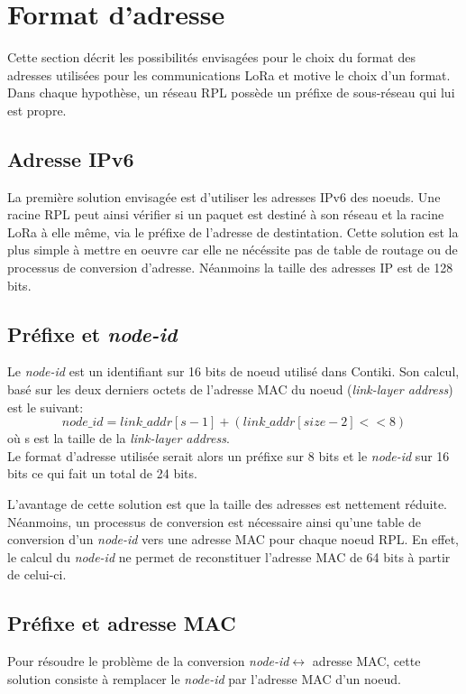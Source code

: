\section{Format d'adresse}\label{sec:archi-adresses}
\renewcommand{\rightmark}{Format d'adresse}

Cette section décrit les possibilités envisagées pour le choix du format des adresses utilisées pour les communications LoRa et motive le choix d'un format. Dans chaque hypothèse, un réseau RPL possède un préfixe de sous-réseau qui lui est propre.

\subsection*{Adresse IPv6}
    La première solution envisagée est d'utiliser les adresses IPv6 des noeuds.
    Une racine RPL peut ainsi vérifier si un paquet est destiné à son réseau et la racine LoRa à elle même,
    via le préfixe de l'adresse de destintation.
    Cette solution est la plus simple à mettre en oeuvre car elle ne nécéssite pas de table de routage ou de processus de conversion d'adresse. Néanmoins la taille des adresses IP est de 128 bits.

\subsection*{Préfixe et \textit{node-id}}
    Le \textit{node-id} est un identifiant sur 16 bits de noeud utilisé dans Contiki. Son calcul, basé sur les deux derniers octets de l'adresse MAC du noeud (\textit{link-layer address}) est le suivant:
    \[
        node\_id = link\_addr[s-1] + (link\_addr[size -2] << 8)
    \]
    où s est la taille de la \textit{link-layer address}.\\

    Le format d'adresse utilisée serait alors un préfixe sur 8 bits et le \textit{node-id} sur 16 bits ce qui fait un total de 24 bits.

    L'avantage de cette solution est que la taille des adresses est nettement réduite. Néanmoins, un processus de conversion est nécessaire ainsi qu'une table de conversion d'un \textit{node-id} vers une adresse MAC pour chaque noeud RPL. En effet, le calcul du \textit{node-id} ne permet de reconstituer l'adresse MAC de 64 bits à partir de celui-ci.

\subsection*{Préfixe et adresse MAC}
    Pour résoudre le problème de la conversion \textit{node-id}$\leftrightarrow	$ adresse MAC, cette solution consiste à remplacer le \textit{node-id} par l'adresse MAC d'un noeud.

